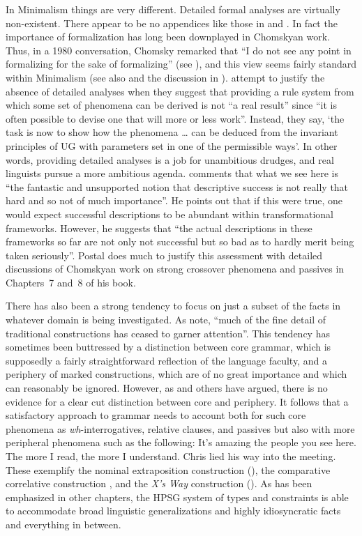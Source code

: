 \documentclass[output=paper]{langsci/langscibook}
\begin{document}
In Minimalism things are very different. Detailed formal analyses are virtually non-existent. There
appear to be no appendices like those in \citet{Sag97a} and \citet{GSag2000a-u}. In fact the
importance of formalization has long been downplayed in Chomskyan work. Thus, in a 1980
conversation, Chomsky remarked that ``I do not see any point in formalizing for the sake of
formalizing'' (see \citealt[73]{HuybregtsRiemsdijk.1982}), and this view
seems fairly standard within Minimalism (see also  and the discussion
in ). \citet[]{CL95a-u}
attempt to justify the absence of detailed analyses when they suggest that providing a rule 
system from which some set of phenomena can be derived is not ``a real result'' since ``it is often
possible to devise one that will more or less work''. Instead, they say, `the task is now to show how
the phenomena \ldots{} can be deduced from the invariant principles of UG with parameters set in one
of the permissible ways'. In other words, providing detailed analyses is a job for unambitious
drudges, and real linguists pursue a more ambitious agenda. \citet[5]{Postal2004a-u} comments that
what we see here is ``the fantastic and unsupported notion that descriptive success is not really
that hard and so not of much importance''. He points out that if this were true, one would expect
successful descriptions to be abundant within transformational frameworks. However, he suggests that
``the actual descriptions in these frameworks so far are not only not successful but so bad as to
hardly merit being taken seriously''. Postal does much to justify this assessment with detailed
discussions of Chomskyan work on strong crossover phenomena and passives in
Chapters~7 and~8 of his book. 

There has also been a strong tendency to focus on just a subset of the facts in whatever domain is being investigated. As \citet[535]{CJ2005a} note, ``much of the fine detail of traditional constructions has ceased to garner attention''. This tendency has sometimes been buttressed by a distinction between core grammar, which is supposedly a fairly straightforward reflection of the language faculty, and a periphery of marked constructions, which are of no great importance and which can reasonably be ignored. However, as \citet{Culicover99a-u} and others have argued, there is no evidence for a clear cut distinction between core and periphery. It follows that a satisfactory approach to grammar needs to account both for such core phenomena as \textit{wh}-interrogatives, relative clauses, and passives but also with more peripheral phenomena such as the following:
\eal
\ex It's amazing the people you see here.\label{ex:min-amazing-people}
\ex The more I read, the more I understand.\label{ex:min-read-understand}
\ex Chris lied his way into the meeting.\label{ex:min-chris-meeting}
\zl 
These exemplify the nominal extraposition construction (\citealt{ML96a}), the comparative correlative construction \citet{Borsley2011a-u}, and the \textit{X's Way} construction (\citealt{Sag2012a}). As has been emphasized in other chapters, the HPSG system of types and constraints is able to accommodate broad linguistic generalizations and highly idiosyncratic facts and everything in between.
\end{document}

